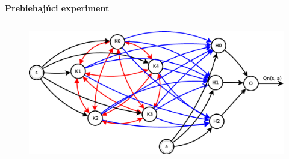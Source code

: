 \documentclass[xcolor=dvipsnames]{beamer}
\begin{document}
\begin{frame}[fragile]{\bf Prebiehajúci experiment}
\begin{columns}
\begin{column}{0.7\textwidth}
            \begin{figure}[ht]

            \begin{center}
            \includegraphics[width=1.0\textwidth]{block_diagram/q_learning_knn.eps}
            \end{center}

            \end{figure}

    	\end{column}
    \end{columns}

\end{frame}
\end{document}
